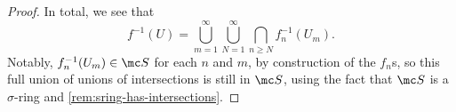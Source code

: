 \documentclass[../notes.tex]{subfiles}
\begin{document}
\begin{proof}
	In total, we see that
	\[f^{-1}(U)=\bigcup_{m=1}^\infty\bigcup_{N=1}^\infty\bigcap_{n\ge N}f_n^{-1}(U_m).\]
	Notably, $f_n^{-1}(U_m)\in\mc S$ for each $n$ and $m$, by construction of the $f_n$s, so this full union of unions of intersections is still in $\mc S$, using the fact that $\mc S$ is a $\sigma$-ring and \autoref{rem:sring-has-intersections}.
\end{proof}


			
\end{document}
